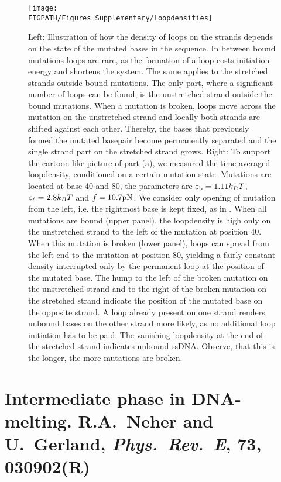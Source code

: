 \begin{figure}[htb]
\centering
\texttt{[image: \\FIGPATH/Figures\_Supplementary/loopdensities]}
\caption[Supp.: Mutation opening is a trade-off between entropy and energy.]
{\label{fig:loopdensities}
Left: Illustration of how the density of loops on the strands depends on the state of the mutated bases in the sequence. In between bound mutations loops are rare, as the formation of a loop costs initiation energy and shortens the system. The same applies to the stretched strands outside bound mutations. The only part, where a significant number of loops can be found, is the unstretched strand outside the bound mutations. When a mutation is broken, loops  move across the mutation on the unstretched strand and locally both strands are shifted against each other. Thereby, the bases that previously formed the mutated basepair become permanently separated and the single strand part on the stretched strand grows.  
Right: To support the cartoon-like picture of part (a), we measured the time averaged loopdensity, conditioned on a certain mutation state.
Mutations are located at base 40 and 80, the parameters are ${\varepsilon_{\rm b}}=1.11k_BT$, ${\varepsilon_{\ell}}=2.8k_BT$ and $f=10.7 \rm pN$. We consider only opening of mutation from the left, i.e. the rightmost base is kept fixed, as in . 
When all mutations are bound (upper panel), the loopdensity is high only on the unstretched
strand to the left of the mutation at position 40. When this mutation is broken (lower panel), loops can spread from the left end to the mutation at position 80, yielding a fairly constant density interrupted only by the permanent loop at the position of the mutated base. The hump to the left of the broken mutation on the unstretched strand and to the right of the broken mutation on the stretched strand indicate the position of the mutated base on the opposite strand. A loop already present on one strand renders unbound bases on the other strand more likely, as no additional loop initiation has to be paid. The vanishing loopdensity at the end of the stretched strand indicates unbound ssDNA. Observe, that this is the longer, the more mutations are broken. }
\end{figure}
\cleardoublepage
\section[R.A.~Neher and U.~Gerland, \emph{Phys.~Rev.~E}, {\bf 73}, 030902(R)]{Intermediate phase in DNA-melting. R.A.~Neher and U.~Gerland, \emph{Phys.~Rev.~E}, {\bf 73}, 030902(R)}
\label{sec:Neher_PRE_06}
\clearpage
\addtocounter{page}{3}


